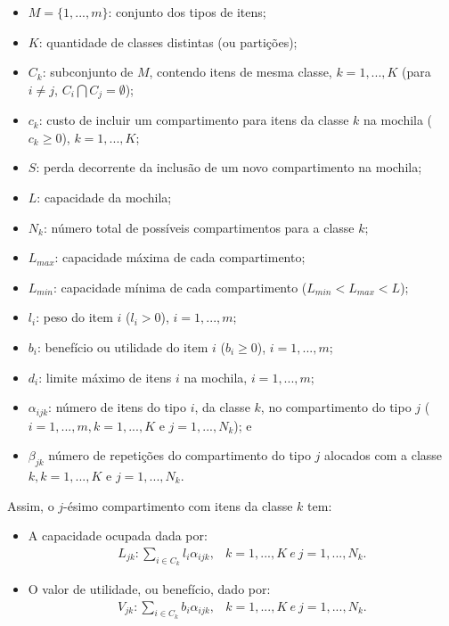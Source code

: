 \begin{itemize}
	\item $M=\{1,...,m\}$: conjunto dos tipos de itens;
	\item $K$: quantidade de classes distintas (ou partições);
	\item $C_k$: subconjunto de $M$, contendo itens de mesma classe, $k=1,...,K$ (para $i \neq j$, $C_i  \bigcap C_j = \emptyset$);
	\item $c_k$: custo de incluir um compartimento para itens da classe $k$ na mochila ($c_{k} \geq 0$), $k = 1, ..., K$;
	\item $S$: perda decorrente da inclusão de um novo compartimento na mochila;
	\item $L$: capacidade da mochila;
	\item $N_k$: número total de possíveis compartimentos para a classe $k$;
	\item $L_{max}$: capacidade máxima de cada compartimento;
	\item $L_{min}$: capacidade mínima de cada compartimento ($L_{min} < L_{max} < L$);
	\item $l_i$: peso do item $i$ ($l_i >0$), $i = 1, ..., m$; 
	\item $b_i$: benefício ou utilidade do item $i$ ($b_i \geq 0$), $i=1,...,m$;
	\item $d_i$: limite máximo de itens $i$ na mochila, $i = 1, ..., m$;
	\item $\alpha_{ijk}$: número de itens do tipo $i$, da classe $k$, no compartimento do tipo $j$ ($i = 1, ..., m, k = 1, ..., K$ e $j = 1, ..., N_{k}$); e
	\item $\beta_{jk}$ número de repetições do compartimento do tipo $j$ alocados com a classe $k, k = 1, ..., K$ e $j = 1, ..., N_{k}$.
\end{itemize}

Assim, o $j$-ésimo compartimento com itens da classe  $k$ tem:

\begin{itemize}
	\item A capacidade ocupada dada por:
	\begin{eqnarray}
		L_{jk}: \sum_{i \in C_{k}}l_{i}\alpha_{ijk}, & k = 1, ..., K \ e \ j = 1, ..., N_{k}.
	\end{eqnarray}

	\item O valor de utilidade, ou benefício, dado por:
	\begin{eqnarray}
		V_{jk}: \sum_{i \in C_{k}}b_{i}\alpha_{ijk}, & k = 1, ..., K \ e \ j = 1, ..., N_{k}.
	\end{eqnarray}

\end{itemize}

